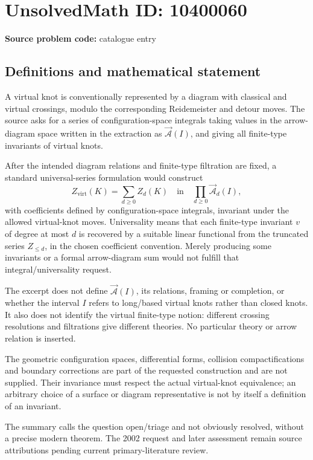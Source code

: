 \documentclass[11pt]{article}
\begin{document}
\section*{UnsolvedMath ID: 10400060}
\textbf{Source problem code:} catalogue entry
\subsection{Definitions and mathematical statement}
A virtual knot is conventionally represented by a diagram with classical and virtual crossings, modulo the corresponding Reidemeister and detour moves. The source asks for a series of configuration-space integrals taking values in the arrow-diagram space written in the extraction as \(\overrightarrow{\mathcal A}(I)\), and giving all finite-type invariants of virtual knots.

After the intended diagram relations and finite-type filtration are fixed, a standard universal-series formulation would construct
\[
 Z_{\mathrm{virt}}(K)=\sum_{d\ge0}Z_d(K)
 \quad\text{in}\quad
 \prod_{d\ge0}\overrightarrow{\mathcal A}_d(I),
\]
with coefficients defined by configuration-space integrals, invariant under the allowed virtual-knot moves. Universality means that each finite-type invariant \(v\) of degree at most \(d\) is recovered by a suitable linear functional from the truncated series \(Z_{\le d}\), in the chosen coefficient convention. Merely producing some invariants or a formal arrow-diagram sum would not fulfill that integral/universality request.

The excerpt does not define \(\overrightarrow{\mathcal A}(I)\), its relations, framing or completion, or whether the interval \(I\) refers to long/based virtual knots rather than closed knots. It also does not identify the virtual finite-type notion: different crossing resolutions and filtrations give different theories. No particular theory or arrow relation is inserted.

The geometric configuration spaces, differential forms, collision compactifications and boundary corrections are part of the requested construction and are not supplied. Their invariance must respect the actual virtual-knot equivalence; an arbitrary choice of a surface or diagram representative is not by itself a definition of an invariant.

The summary calls the question open/triage and not obviously resolved, without a precise modern theorem. The 2002 request and later assessment remain source attributions pending current primary-literature review.
\end{document}

